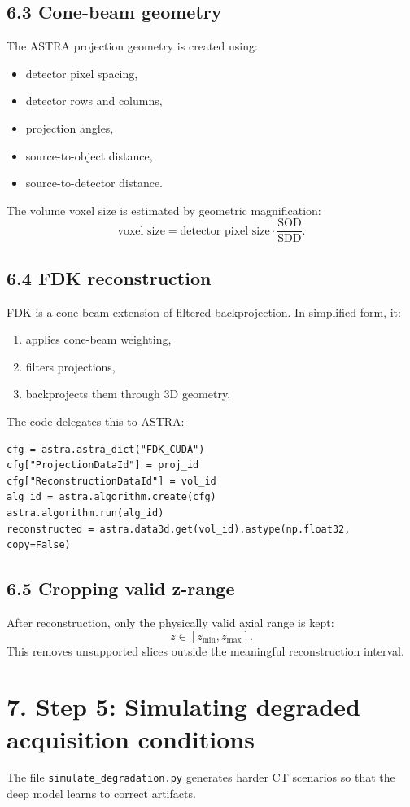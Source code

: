 \documentclass[12pt,a4paper]{article}
\begin{document}
\subsection*{6.3 Cone-beam geometry}
The ASTRA projection geometry is created using:
\begin{itemize}[leftmargin=*]
\item detector pixel spacing,
\item detector rows and columns,
\item projection angles,
\item source-to-object distance,
\item source-to-detector distance.
\end{itemize}

The volume voxel size is estimated by geometric magnification:
\[
\text{voxel size} = \text{detector pixel size} \cdot \frac{\text{SOD}}{\text{SDD}}.
\]

\subsection*{6.4 FDK reconstruction}
FDK is a cone-beam extension of filtered backprojection. In simplified form, it:
\begin{enumerate}[leftmargin=*]
\item applies cone-beam weighting,
\item filters projections,
\item backprojects them through 3D geometry.
\end{enumerate}

The code delegates this to ASTRA:
\begin{lstlisting}[style=py,caption={Running FDK with ASTRA}]
cfg = astra.astra_dict("FDK_CUDA")
cfg["ProjectionDataId"] = proj_id
cfg["ReconstructionDataId"] = vol_id
alg_id = astra.algorithm.create(cfg)
astra.algorithm.run(alg_id)
reconstructed = astra.data3d.get(vol_id).astype(np.float32, copy=False)
\end{lstlisting}

\subsection*{6.5 Cropping valid z-range}
After reconstruction, only the physically valid axial range is kept:
\[
z \in [z_{\min}, z_{\max}].
\]
This removes unsupported slices outside the meaningful reconstruction interval.

\section*{7. Step 5: Simulating degraded acquisition conditions}
The file \texttt{simulate\_degradation.py} generates harder CT scenarios so that the deep model learns to correct artifacts.
\end{document}
